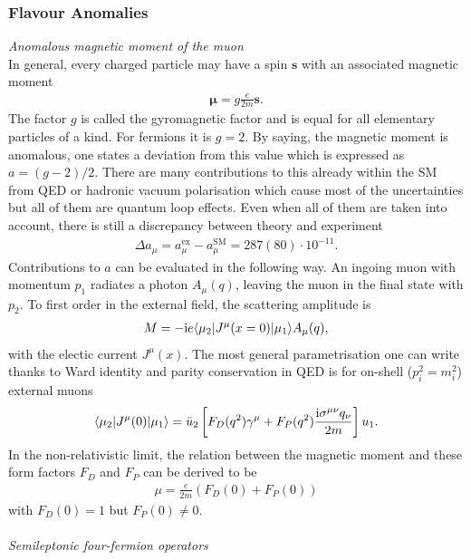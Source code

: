 \subsubsection{Flavour Anomalies}
\label{sec_flAnom}
\textit{Anomalous magnetic moment of the muon}\\
\noindent
In general, every charged particle
may have a spin $\boldsymbol{s}$ with an associated magnetic moment \cite{anomMom}
\begin{align}
 \boldsymbol{\mu} = g \frac{e}{2m}\boldsymbol{s}.
\end{align}
The factor $g$ is called the gyromagnetic factor and is equal for all elementary particles of a kind. For fermions it is $g=2$. By saying, the magnetic 
moment is anomalous, one states a deviation from this value which is expressed as $a= (g-2)/2$. There are many contributions to this already within the SM
from QED or hadronic vacuum polarisation which cause most of the uncertainties \cite{160606861} but all of them are quantum loop effects. Even when all of them are taken into account, there is still a discrepancy
between theory and experiment 
\begin{align}
 \Delta a_\mu = a_\mu^\text{ex} - a_\mu^\text{SM} = 287(80)\cdot 10^{-11}.
\end{align}
Contributions to $a$ can be evaluated in the following way. An ingoing muon with momentum $p_1$ radiates a photon $A_\mu (q)$, leaving the muon in the final 
state with $p_2$. To first order in the external field, the scattering amplitude is 
\begin{align}
 M = -\text{i} e \langle \mu_2|J^\mu(x=0)|\mu_1\rangle A_\mu(q),
\end{align}
with the electic current $J^\mu(x)$. The most general parametrisation one can write thanks to Ward identity and parity conservation in QED is for on-shell
($p_i^2 = m_i^2$) external muons
\begin{align}
 \langle \mu_2|J^\mu(0)|\mu_1\rangle = \bar u_2 \left[F_D(q^2)\gamma^\mu + F_P(q^2)\frac{\text{i} \sigma^{\mu\nu}q_\nu}{2m}\right] u_1.
 \label{eq_gordon}
\end{align}
In the non-relativistic limit, the relation between the magnetic moment and these form factors $F_D$ and $F_P$ can be derived to be
\begin{align}
 \mu = \frac{e}{2m}\left(F_D(0) + F_P(0)\right)
\end{align}
\noindent
with $F_D(0)=1$ but $F_P(0)\neq0$.
\\ \\ \textit{Semileptonic four-fermion operators}\\
